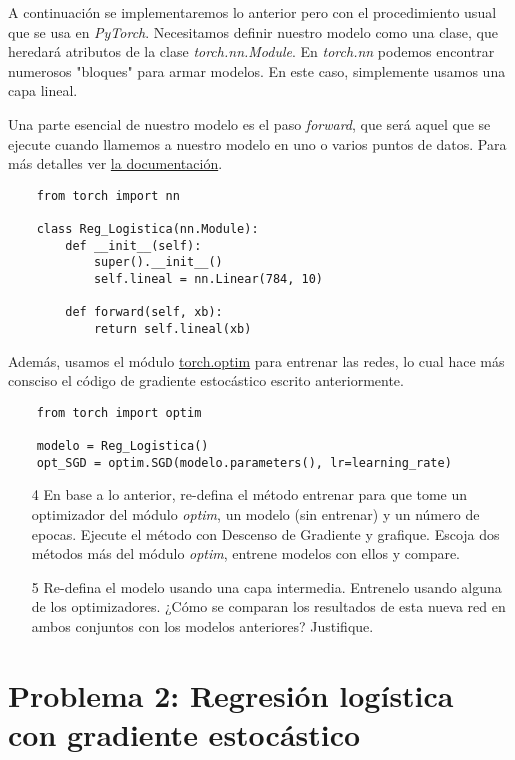 A continuación se implementaremos lo anterior pero con el procedimiento usual que se usa en \textit{PyTorch}. Necesitamos definir nuestro modelo como una clase, que heredará atributos de la clase \textit{torch.nn.Module}. En \textit{torch.nn} podemos encontrar numerosos "bloques" para armar modelos. En este caso, simplemente usamos una capa lineal.

\newp Una parte esencial de nuestro modelo es el paso \textit{forward}, que será aquel que se ejecute cuando llamemos a nuestro modelo en uno o varios puntos de datos. Para más detalles ver \href{https://pytorch.org/docs/stable/nn.html}{la documentación}.

\begin{verbatim}
    from torch import nn

    class Reg_Logistica(nn.Module):
        def __init__(self):
            super().__init__()
            self.lineal = nn.Linear(784, 10)
    
        def forward(self, xb):
            return self.lineal(xb)
\end{verbatim}

Además, usamos el módulo \href{https://pytorch.org/docs/stable/optim.html}{torch.optim} para entrenar las redes, lo cual hace más consciso el código de gradiente estocástico escrito anteriormente.

\begin{verbatim}
    from torch import optim

    modelo = Reg_Logistica()
    opt_SGD = optim.SGD(modelo.parameters(), lr=learning_rate)
\end{verbatim}

\begin{itemize}
    \item[4] En base a lo anterior, re-defina el método entrenar para que tome un optimizador del módulo \textit{optim}, un modelo (sin entrenar) y un número de epocas. Ejecute el método con Descenso de Gradiente y grafique. Escoja dos métodos más del módulo \textit{optim}, entrene modelos con ellos y compare.
    \item[5] Re-defina el modelo usando una capa intermedia. Entrenelo usando alguna de los optimizadores. ¿Cómo se comparan los resultados de esta nueva red en ambos conjuntos con los modelos anteriores? Justifique.
\end{itemize}

\section*{Problema 2: Regresi\'on log\'istica con gradiente estocástico }

